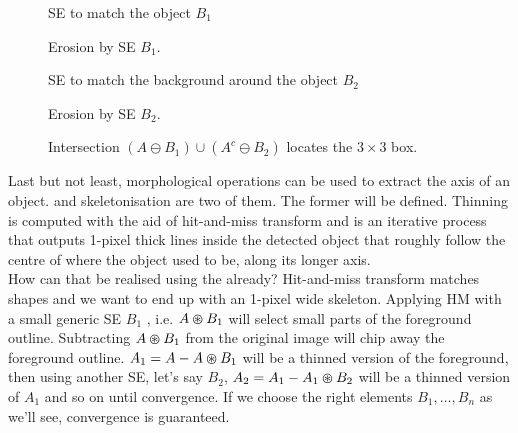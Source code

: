 \documentclass[a4paper]{article}
\begin{document}
\begin{multicols}{2}

\begin{figure}[H]
    \centering
    
    {\caption{SE to match the object $B_1$}}
\end{figure}
\begin{figure}[H]
    \centering
    
    {\caption{Erosion by SE $B_1$.}}
\end{figure}

\columnbreak
\begin{figure}[H]
    \centering
    
    {\caption{SE to match the background around the object $B_2$}}
\end{figure}
\begin{figure}[H]
    \centering
    
    {\caption{Erosion by SE $B_2$.}}
\end{figure}
\end{multicols}


\begin{figure}[H]
    \centering
    
    {\caption{Intersection $ \left( A \ominus B_1 \right) \cup \left( A^c \ominus B_2 \right)$ locates the $3\times 3$ box.}}
\end{figure}






Last but not least, morphological operations can be used to extract the axis of an object.  and skeletonisation are two of them. The former will be defined. Thinning is computed with the aid of hit-and-miss transform and is an iterative process that outputs 1-pixel thick lines inside the detected object that roughly follow the centre of where the object used to be, along its longer axis.\\
How can that be realised using the already? Hit-and-miss transform matches shapes and we want to end up with an 1-pixel wide skeleton. Applying HM with a small generic SE $B_1$ , i.e. $A \varoast B_1$ will select small parts of the foreground outline. Subtracting $A \varoast B_1$ from the original image will chip away the foreground outline. $A_1 = A - A \varoast B_1$ will be a thinned version of the foreground, then using another SE, let's say $B_2$, $A_2 = A_1 - A_1 \varoast B_2$ will be a thinned version of $A_1$ and so on until convergence. If we choose the right elements $B_1, \ldots, B_n$ as we'll see, convergence is guaranteed.
\end{document}
